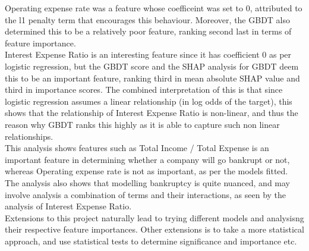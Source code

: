 \documentclass[11pt]{article}
\begin{document}
Operating expense rate was a feature whose coefficeint was set to $0$, attributed to the l1 penalty term that encourages this behaviour. Moreover, the GBDT also determined this to be a relatively poor feature, ranking second last in terms of feature importance.  \\

Interest Expense Ratio is an interesting feature since it has coefficient 0 as per logistic regression, but the GBDT score and the SHAP analysis for GBDT deem this to be an important feature, ranking third in mean absolute SHAP value and third in importance scores. The combined interpretation of this is that since logistic regression assumes a linear relationship (in log odds of the target), this shows that the relationship of Interest Expense Ratio is non-linear, and thus the reason why GBDT ranks this highly as it is able to capture such non linear relationships. \\

This analysis shows features such as Total Income / Total Expense is an important feature in determining whether a company will go bankrupt or not, whereas Operating expense rate is not as important, as per the models fitted. The analysis also shows that modelling bankruptcy is quite nuanced, and may involve analysis a combination of terms and their interactions, as seen by the analysis of Interest Expense Ratio. \\

Extensions to this project naturally lead to trying different models and analysisng their respective feature importances. Other extensions is to take a more statistical approach, and use statistical tests to determine significance and importance etc. 


\end{document}
